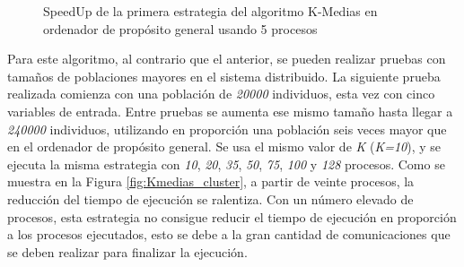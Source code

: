 			
			
			
			\begin{figure}[!h]
			\centering
			\caption{SpeedUp de la primera estrategia del algoritmo K-Medias en ordenador de propósito general usando 5 procesos}
			\label{fig:Kmedias_speedup}
			\end{figure}
			
					
					
		
			Para este algoritmo, al contrario que el anterior, se pueden realizar pruebas con tamaños de poblaciones mayores en el sistema distribuido. La siguiente prueba realizada comienza con una población de \textit{20000} individuos, esta vez con cinco variables de entrada. Entre pruebas se aumenta ese mismo tamaño hasta llegar a \textit{240000} individuos, utilizando en proporción una población seis veces mayor que en el ordenador de propósito general. Se usa el mismo valor de \textit{K} (\textit{K=10}), y se ejecuta la misma estrategia con \textit{10}, \textit{20}, \textit{35}, \textit{50}, \textit{75}, \textit{100} y \textit{128} procesos. Como se muestra en la Figura \ref{fig:Kmedias_cluster}, a partir de veinte procesos, la reducción del tiempo de ejecución se ralentiza. Con un número elevado de procesos, esta estrategia no consigue reducir el tiempo de ejecución en proporción a los procesos ejecutados, esto se debe a la gran cantidad de comunicaciones que se deben realizar para finalizar la ejecución.
			
